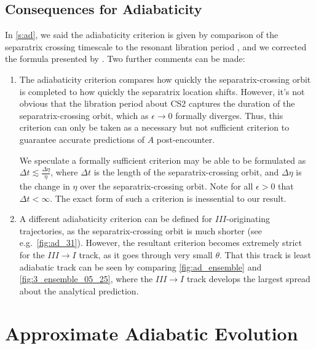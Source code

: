 \documentclass[
        fleqn,
        usenatbib,
        referee,
    ]{mnras}
\begin{document}
\subsection{Consequences for Adiabaticity}\label{ss:careful_ad}

In \autoref{s:ad}, we said the adiabaticity criterion is given by comparison of
the separatrix crossing timescale to the resonant libration period
\citep{ward2004II}, and we corrected the formula presented by
\citet{millholland_disk}. Two further comments can be made:
\begin{enumerate}
    \item The adiabaticity criterion compares how quickly the
        separatrix-crossing orbit is completed to how quickly the separatrix
        location shifts. However, it's not obvious that the libration period
        about CS2 captures the duration of the separatrix-crossing orbit, which
        as $\epsilon \to 0$ formally diverges. Thus, this criterion can only be
        taken as a necessary but not sufficient criterion to guarantee accurate
        predictions of $A$ post-encounter.

        We speculate a formally sufficient criterion may be able to be
        formulated as $\Delta t \lesssim \frac{\Delta \eta}{\dot{\eta}}$, where
        $\Delta t$ is the length of the separatrix-crossing orbit, and $\Delta
        \eta$ is the change in $\eta$ over the separatrix-crossing orbit. Note
        for all $\epsilon > 0$ that $\Delta t < \infty$. The exact form of such
        a criterion is inessential to our result.

    \item A different adiabaticity criterion can be defined for
        $III$-originating trajectories, as the separatrix-crossing orbit is much
        shorter (see e.g.\ \autoref{fig:ad_31}). However, the resultant
        criterion becomes extremely strict for the $III \to I$ track, as it goes
        through very small $\theta$. That this track is least adiabatic track
        can be seen by comparing \autoref{fig:ad_ensemble} and
        \autoref{fig:3_ensemble_05_25}, where the $III \to I$ track develops the
        largest spread about the analytical prediction.
\end{enumerate}

\section{Approximate Adiabatic Evolution}\label{s:ad_approx}
\end{document}
